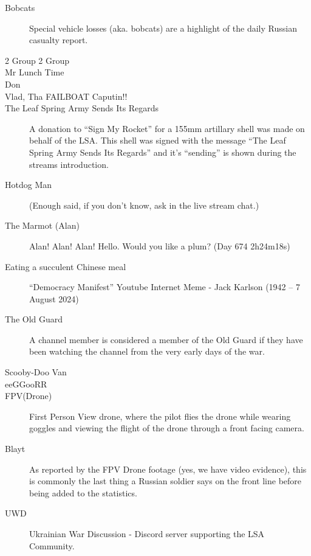 \documentclass[11pt]{book}
\begin{document}
\begin{description}
\item[Bobcats \bobcat]  Special vehicle losses (aka. bobcats) are a highlight of the
daily Russian casualty report.

\item [2 Group 2 Group]

\item [Mr Lunch Time]

\item[Don]
 
\item[Vlad, Tha FAILBOAT Caputin!!]

\item [The Leaf Spring Army Sends Its Regards] A donation to ``Sign My Rocket'' for a
  155mm artillary shell was made on behalf of the LSA. This shell was signed with the 
  message ``The Leaf Spring Army Sends Its Regards'' and it's ``sending'' is 
  shown during the streams introduction. 

\item[Hotdog Man] (Enough said, if you don't know, ask in the live stream chat.)

\item[The Marmot (Alan)]  Alan! Alan! Alan! Hello. Would you like a plum? 
  (Day 674 2h24m18s)

\item[Eating a succulent Chinese meal] ``Democracy Manifest'' Youtube Internet Meme
- Jack Karlson (1942 – 7 August 2024)

\item[The Old Guard] A channel member is considered a member of the Old Guard if they have 
  been watching the channel from the very early days of the war.  

\item [Scooby-Doo Van]

\item [eeGGooRR]

\item [FPV(Drone)] First Person View drone, where the pilot flies the drone while wearing goggles and
  viewing the flight of the drone through a front facing camera. 

\item[Blayt] As reported by the FPV Drone footage (yes, we have video evidence), this is 
  commonly the last thing a Russian soldier says on the front line before being added to the
  statistics. 

\item[UWD] Ukrainian War Discussion - Discord server supporting the LSA Community.
\end{description}
\end{document}
